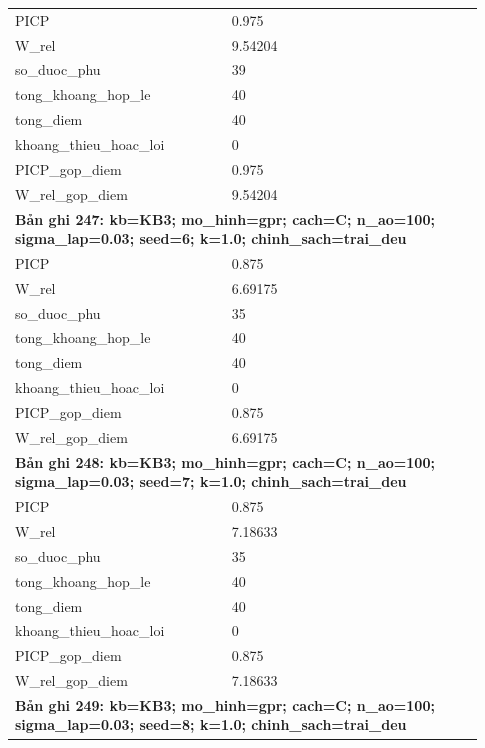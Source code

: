 \begin{longtable}{p{0.43\linewidth}p{0.50\linewidth}}
PICP & 0.975 \\
W\_\allowbreak rel & 9.54204 \\
so\_\allowbreak duoc\_\allowbreak phu & 39 \\
tong\_\allowbreak khoang\_\allowbreak hop\_\allowbreak le & 40 \\
tong\_\allowbreak diem & 40 \\
khoang\_\allowbreak thieu\_\allowbreak hoac\_\allowbreak loi & 0 \\
PICP\_\allowbreak gop\_\allowbreak diem & 0.975 \\
W\_\allowbreak rel\_\allowbreak gop\_\allowbreak diem & 9.54204 \\
\midrule
\multicolumn{2}{p{0.95\linewidth}}{\textbf{Bản ghi 247: kb=KB3; mo\_hinh=gpr; cach=C; n\_ao=100; sigma\_lap=0.03; seed=6; k=1.0; chinh\_sach=trai\_deu}} \\
PICP & 0.875 \\
W\_\allowbreak rel & 6.69175 \\
so\_\allowbreak duoc\_\allowbreak phu & 35 \\
tong\_\allowbreak khoang\_\allowbreak hop\_\allowbreak le & 40 \\
tong\_\allowbreak diem & 40 \\
khoang\_\allowbreak thieu\_\allowbreak hoac\_\allowbreak loi & 0 \\
PICP\_\allowbreak gop\_\allowbreak diem & 0.875 \\
W\_\allowbreak rel\_\allowbreak gop\_\allowbreak diem & 6.69175 \\
\midrule
\multicolumn{2}{p{0.95\linewidth}}{\textbf{Bản ghi 248: kb=KB3; mo\_hinh=gpr; cach=C; n\_ao=100; sigma\_lap=0.03; seed=7; k=1.0; chinh\_sach=trai\_deu}} \\
PICP & 0.875 \\
W\_\allowbreak rel & 7.18633 \\
so\_\allowbreak duoc\_\allowbreak phu & 35 \\
tong\_\allowbreak khoang\_\allowbreak hop\_\allowbreak le & 40 \\
tong\_\allowbreak diem & 40 \\
khoang\_\allowbreak thieu\_\allowbreak hoac\_\allowbreak loi & 0 \\
PICP\_\allowbreak gop\_\allowbreak diem & 0.875 \\
W\_\allowbreak rel\_\allowbreak gop\_\allowbreak diem & 7.18633 \\
\midrule
\multicolumn{2}{p{0.95\linewidth}}{\textbf{Bản ghi 249: kb=KB3; mo\_hinh=gpr; cach=C; n\_ao=100; sigma\_lap=0.03; seed=8; k=1.0; chinh\_sach=trai\_deu}} \\

\end{longtable}
